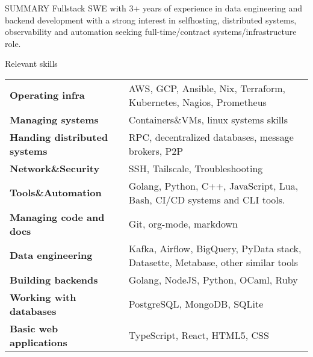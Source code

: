 \documentclass{resume} %
\begin{document}

\begin{rSection}{SUMMARY}
  {Fullstack SWE with 3+ years of experience in data engineering and backend development with a strong interest in selfhosting, distributed systems, observability and automation seeking full-time/contract systems/infrastructure role.}
\end{rSection}

\begin{rSection}{Relevant skills}
  \begin{tabular}{ @{} >{\bfseries}l @{\hspace{6ex}} l }
    Operating infra & AWS, GCP, Ansible, Nix, Terraform, Kubernetes, Nagios, Prometheus\\
    Managing systems & Containers\&VMs, linux systems skills\\
    Handing distributed systems & RPC, decentralized databases, message brokers, P2P\\
    Network\&Security & SSH, Tailscale, Troubleshooting\\
    Tools\&Automation & Golang, Python, C++, JavaScript, Lua, Bash, CI/CD systems and CLI tools.\\
    Managing code and docs & Git, org-mode, markdown\\
    Data engineering & Kafka, Airflow, BigQuery, PyData stack, Datasette, Metabase, other similar tools\\
    Building backends & Golang, NodeJS, Python, OCaml, Ruby\\
    Working with databases & PostgreSQL, MongoDB, SQLite\\
    Basic web applications & TypeScript, React, HTML5, CSS\\
  \end{tabular}\
\end{rSection}
\end{document}
